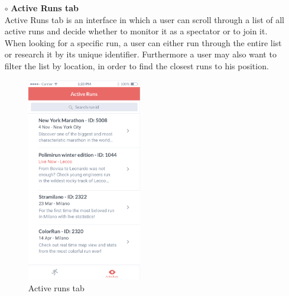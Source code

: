\documentclass[titlepage]{article}
\begin{document}
\begin{itemize}
\begin{itemize}
\begin{itemize}
					\item[$\circ$] {\bf Active Runs tab} \\
Active Runs tab is an interface in which a user can scroll through a list of all active runs and decide whether to monitor it as a spectator or to join it. When looking for a specific run, a user can either run through the entire list or research it by its unique identifier. Furthermore a user may also want to filter the list by location, in order to find the closest runs to his position.\\
					\begin{figure}[H]
						\center
  						\includegraphics[width=5cm]{Mockup/mockupActiveRunsSU.png}
  						\caption{Active runs tab}
 					 	\label{fig:ActiveRuns}
					\end{figure}
				\end{itemize}


\end{itemize}
\end{itemize}
\end{document}
